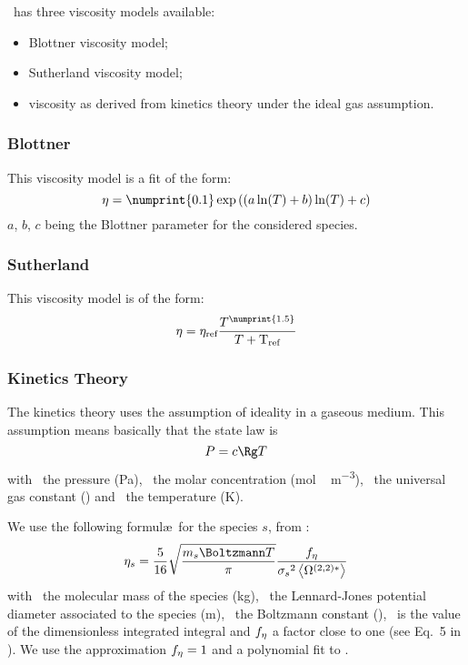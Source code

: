 \Antioch\ has three viscosity models available:
\begin{itemize}
\item Blottner viscosity model;
\item Sutherland viscosity model;
\item viscosity as derived from kinetics theory under the ideal gas assumption.
\end{itemize}

\subsubsection{Blottner}
\label{transport:viscosity:blottner}

This viscosity model is a fit of the form:
\begin{equation}
\vis = \numprint{0.1} \exp\left((a \ln(\Temp) + b) \ln(\Temp) + c\right)
\label{blottner:eq}
\end{equation}
$a$, $b$, $c$ being the Blottner parameter for the considered
species.

\subsubsection{Sutherland}
\label{transport:viscosity:sutherland}

This viscosity model is of the form:
\begin{equation}
\vis = \vis_\text{ref} \frac{\Temp^{\numprint{1.5}}}{\Temp + \text{T}_\text{ref}}
\label{sutherland:eq}
\end{equation}

\subsubsection{Kinetics Theory}
\label{transport:viscosity:kin_theo}

The kinetics theory uses the assumption of ideality in a 
gaseous medium. This assumption means basically that the
state law is
\begin{equation}
\Press = \conc\Rg \Temp
\end{equation}
with \Press\ the pressure (\unit{Pa}), \conc\ the molar concentration
(\unit{mol\,m^{-3}}), \Rg\ the universal gas constant (\RgEquation)
and \Temp\ the temperature (\unit{K}).

We use the following formul\ae\ for the species $s$, from \citet{Monchick1961}:
\begin{equation}
\vis[s] = \frac{5}{16} \sqrt{\frac{\Mass[s]\Boltzmann\Temp}{\pi}}\frac{f_{\vis}}{\LJdia[s]^2\Stockmayer{2}}
\label{visc_kin_theory:eq}
\end{equation}
with \Mass\ the molecular mass of the species (\unit{kg}), \LJdia\ the Lennard-Jones
potential diameter associated to the species (\unit{m}), \Boltzmann\ the Boltzmann
constant (\BoltzmannEquation), \ is the
value of the dimensionless integrated integral and $f_{\vis}$ a factor close
to one (see Eq.~5 in \citet{Monchick1961}). We use the approximation
$f_{\vis} = 1$ and a polynomial fit to .


